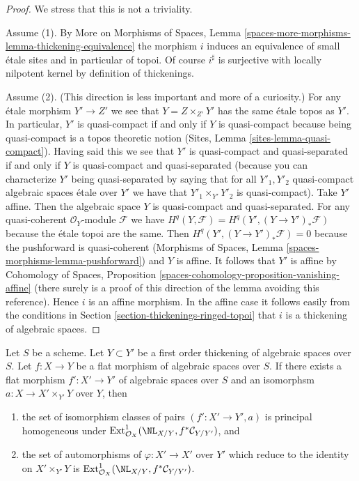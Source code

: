 \begin{proof}
We stress that this is not a triviality.

\medskip\noindent
Assume (1). By More on Morphisms of Spaces, Lemma
\ref{spaces-more-morphisms-lemma-thickening-equivalence}
the morphism $i$ induces an equivalence of small \'etale
sites and in particular of topoi. Of course $i^\sharp$
is surjective with locally nilpotent kernel by definition
of thickenings.

\medskip\noindent
Assume (2). (This direction is less important and more of
a curiosity.) For any \'etale morphism $Y' \to Z'$ we see
that $Y = Z \times_{Z'} Y'$ has the same \'etale topos
as $Y'$. In particular, $Y'$ is quasi-compact if and only if
$Y$ is quasi-compact because being quasi-compact
is a topos theoretic notion (Sites, Lemma \ref{sites-lemma-quasi-compact}).
Having said this we see that $Y'$ is quasi-compact and quasi-separated
if and only if $Y$ is quasi-compact and quasi-separated
(because you can characterize $Y'$ being quasi-separated by saying
that for all $Y'_1, Y'_2$ quasi-compact algebraic spaces \'etale over $Y'$
we have that $Y'_1 \times_{Y'} Y'_2$ is quasi-compact).
Take $Y'$ affine. Then the algebraic space $Y$ is
quasi-compact and quasi-separated. For any
quasi-coherent $\mathcal{O}_Y$-module $\mathcal{F}$ we have
$H^q(Y, \mathcal{F}) = H^q(Y', (Y \to Y')_*\mathcal{F})$
because the \'etale topoi are the same.
Then $H^q(Y', (Y \to Y')_*\mathcal{F}) = 0$
because the pushforward is quasi-coherent
(Morphisms of Spaces, Lemma \ref{spaces-morphisms-lemma-pushforward})
and $Y$ is affine. It follows that $Y'$ is affine by
Cohomology of Spaces, Proposition
\ref{spaces-cohomology-proposition-vanishing-affine}
(there surely is a proof of this direction of the lemma
avoiding this reference).
Hence $i$ is an affine morphism. In the affine case it
follows easily from the conditions in
Section \ref{section-thickenings-ringed-topoi}
that $i$ is a thickening of algebraic spaces.
\end{proof}

\begin{lemma}
\label{lemma-deform-spaces}
Let $S$ be a scheme.
Let $Y \subset Y'$ be a first order thickening of algebraic spaces
over $S$.
Let $f : X \to Y$ be a flat morphism of algebraic spaces over $S$.
If there exists a flat morphism $f' : X' \to Y'$ of algebraic spaces over $S$
and an isomorphsm $a : X \to X' \times_{Y'} Y$ over $Y$, then
\begin{enumerate}
\item the set of isomorphism classes of pairs $(f' : X' \to Y', a)$ is
principal homogeneous under
$\text{Ext}^1_{\mathcal{O}_X}(\NL_{X/Y}, f^*\mathcal{C}_{Y/Y'})$, and
\item the set of automorphisms of $\varphi : X' \to X'$
over $Y'$ which reduce to the identity on $X' \times_{Y'} Y$
is $\text{Ext}^1_{\mathcal{O}_X}(\NL_{X/Y}, f^*\mathcal{C}_{Y/Y'})$.
\end{enumerate}
\end{lemma}


